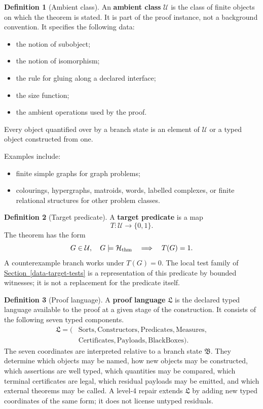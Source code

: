 \documentclass[
  11pt,
]{article}
\theoremstyle{definition}
\newtheorem{definition}{Definition}[section]
\newcommand{\secref}[1]{\hyperref[#1]{Section~\ref*{#1}}}
\begin{document}
\begin{definition}[Ambient class]\label{def:ambient-class}
An \textbf{ambient class} \(\mathcal U\) is the class of finite objects
on which the theorem is stated.  It is part of the proof instance, not a
background convention.  It specifies the following data:
\begin{itemize}
\item the notion of subobject;
\item the notion of isomorphism;
\item the rule for gluing along a declared interface;
\item the size function;
\item the ambient operations used by the proof.
\end{itemize}
Every object quantified over by a branch state is an element of
\(\mathcal U\) or a typed object constructed from one.

Examples include:
\begin{itemize}
\item finite simple graphs for graph problems;
\item colourings, hypergraphs, matroids, words, labelled complexes, or
finite relational structures for other problem classes.
\end{itemize}
\end{definition}

\begin{definition}[Target predicate]\label{def:target-predicate}
A \textbf{target predicate} is a map
\[
T:\mathcal U\longrightarrow\{0,1\}.
\]
The theorem has the form
\[
G\in\mathcal U,\quad G\models \mathcal H_{\rm thm}
\quad\Longrightarrow\quad T(G)=1.
\]
A counterexample branch works under \(T(G)=0\).  The local test family of
\secref{data-target-tests} is a representation of this predicate by
bounded witnesses; it is not a replacement for the predicate itself.
\end{definition}

\begin{definition}[Proof language]\label{def:proof-language}
A \textbf{proof language} \(\mathfrak L\) is the declared typed
language available to the proof at a given stage of the construction.
It consists of the following seven typed components.
\[
\begin{aligned}
\mathfrak L
=(&\mathrm{Sorts},\mathrm{Constructors},\mathrm{Predicates},
   \mathrm{Measures},\\
  &\mathrm{Certificates},\mathrm{Payloads},\mathrm{BlackBoxes}).
\end{aligned}
\]
The seven coordinates are interpreted relative to a branch state
\(\mathfrak B\).  They determine which objects may be named, how new
objects may be constructed, which assertions are well typed, which
quantities may be compared, which terminal certificates are legal, which
residual payloads may be emitted, and which external theorems may be
called.  A level-4 repair extends \(\mathfrak L\) by adding new typed
coordinates of the same form; it does not license untyped residuals.
\end{definition}
\end{document}
